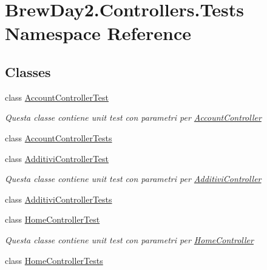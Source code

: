 \hypertarget{namespace_brew_day2_1_1_controllers_1_1_tests}{}\section{Brew\+Day2.\+Controllers.\+Tests Namespace Reference}
\label{namespace_brew_day2_1_1_controllers_1_1_tests}
\subsection*{Classes}
\begin{DoxyCompactItemize}
\item 
class \mbox{\hyperlink{class_brew_day2_1_1_controllers_1_1_tests_1_1_account_controller_test}{Account\+Controller\+Test}}
\begin{DoxyCompactList}\small\item\em Questa classe contiene unit test con parametri per \mbox{\hyperlink{class_brew_day2_1_1_controllers_1_1_account_controller}{Account\+Controller}}\end{DoxyCompactList}\item 
class \mbox{\hyperlink{class_brew_day2_1_1_controllers_1_1_tests_1_1_account_controller_tests}{Account\+Controller\+Tests}}
\item 
class \mbox{\hyperlink{class_brew_day2_1_1_controllers_1_1_tests_1_1_additivi_controller_test}{Additivi\+Controller\+Test}}
\begin{DoxyCompactList}\small\item\em Questa classe contiene unit test con parametri per \mbox{\hyperlink{class_brew_day2_1_1_controllers_1_1_additivi_controller}{Additivi\+Controller}}\end{DoxyCompactList}\item 
class \mbox{\hyperlink{class_brew_day2_1_1_controllers_1_1_tests_1_1_additivi_controller_tests}{Additivi\+Controller\+Tests}}
\item 
class \mbox{\hyperlink{class_brew_day2_1_1_controllers_1_1_tests_1_1_home_controller_test}{Home\+Controller\+Test}}
\begin{DoxyCompactList}\small\item\em Questa classe contiene unit test con parametri per \mbox{\hyperlink{class_brew_day2_1_1_controllers_1_1_home_controller}{Home\+Controller}}\end{DoxyCompactList}\item 
class \mbox{\hyperlink{class_brew_day2_1_1_controllers_1_1_tests_1_1_home_controller_tests}{Home\+Controller\+Tests}}

\end{DoxyCompactItemize}
